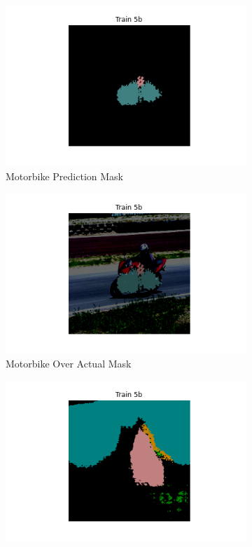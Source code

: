 \documentclass{article}
\begin{document}
\begin{figure}[h]
\begin{subfigure}[b]{0.45\textwidth}
    \includegraphics[width=\textwidth]{include/best model/motorbike1_pred.png}
    \caption{Motorbike Prediction Mask}
  \end{subfigure}
  \hfill %
  \begin{subfigure}[b]{0.45\textwidth}
    \centering
    \includegraphics[width=\textwidth]{include/best model/motorbike1_over_actual.png} %
    \caption{Motorbike Over Actual Mask}
  \end{subfigure}
  \begin{subfigure}[b]{0.45\textwidth}
    \centering
    \includegraphics[width=\textwidth]{include/best model/msc1_pred.png}

\end{subfigure}
\end{figure}
\end{document}
